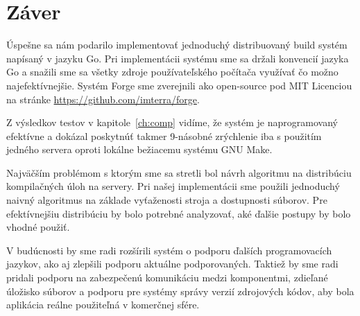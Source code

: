 \chapter*{Záver}

Úspešne sa nám podarilo implementovať jednoduchý distribuovaný build systém napísaný
v jazyku Go. Pri implementácii systému sme sa držali konvencií jazyka Go a snažili
sme sa všetky zdroje používateľského počítača využívať čo možno najefektívnejšie.
Systém Forge sme zverejnili ako open-source pod MIT Licenciou na stránke
\url{https://github.com/imterra/forge}.

Z výsledkov testov v kapitole~\ref{ch:comp} vidíme, že systém je naprogramovaný
efektívne a dokázal poskytnúť takmer 9-násobné zrýchlenie iba s použitím jedného
servera oproti lokálne bežiacemu systému GNU Make.

Najväčším problémom s ktorým sme sa stretli bol návrh algoritmu na distribúciu
kompilačných úloh na servery. Pri našej implementácii sme použili jednoduchý
naivný algoritmus na základe vyťaženosti stroja a dostupnosti súborov. Pre
efektívnejšiu distribúciu by bolo potrebné analyzovať, aké ďalšie postupy by
bolo vhodné použiť.

V budúcnosti by sme radi rozšírili systém o podporu ďalších programovacích jazykov,
ako aj zlepšili podporu aktuálne podporovaných. Taktiež by sme radi pridali
podporu na zabezpečenú komunikáciu medzi komponentmi, zdieľané úložisko súborov
a podporu pre systémy správy verzií zdrojových kódov, aby bola aplikácia reálne
použiteľná v komerčnej sfére.
